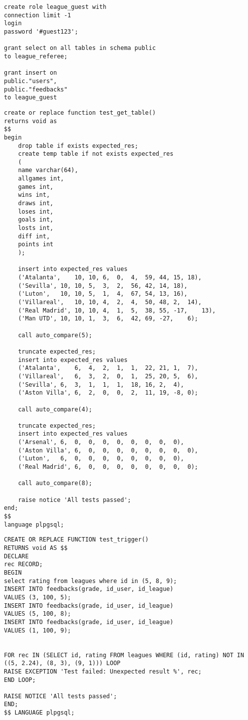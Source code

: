 \begin{lstlisting}[caption={Создание роли гости и выдыча права}, label={lst:role5}]
create role league_guest with
connection limit -1
login
password '#guest123';

grant select on all tables in schema public
to league_referee;	

grant insert on
public."users",
public."feedbacks"
to league_guest
\end{lstlisting}

\begin{lstlisting}[caption={Реализация тестирования для функции get\_table\_league}, label={lst:test1}]
create or replace function test_get_table()
returns void as
$$
begin
	drop table if exists expected_res;
	create temp table if not exists expected_res
	(
	name varchar(64),
	allgames int,
	games int,
	wins int,
	draws int,
	loses int,
	goals int,
	losts int,
	diff int,
	points int
	);
	
	insert into expected_res values
	('Atalanta',	10,	10,	6,	0,	4,	59,	44,	15,	18),
	('Sevilla',	10,	10,	5,	3,	2,	56,	42,	14,	18),
	('Luton',	10,	10,	5,	1,	4,	67,	54,	13,	16),
	('Villareal',	10,	10,	4,	2,	4,	50,	48,	2,	14),
	('Real Madrid',	10,	10,	4,	1,	5,	38,	55,	-17,	13),
	('Man UTD',	10,	10,	1,	3,	6,	42,	69,	-27,	6);
	
	call auto_compare(5);
	
	truncate expected_res;
	insert into expected_res values
	('Atalanta',	6,	4,	2,	1,	1,	22,	21,	1,	7),
	('Villareal',	6,	3,	2,	0,	1,	25,	20,	5,	6),
	('Sevilla',	6,	3,	1,	1,	1,	18,	16,	2,	4),
	('Aston Villa',	6,	2,	0,	0,	2,	11,	19,	-8,	0);
	
	call auto_compare(4);
	
	truncate expected_res;
	insert into expected_res values
	('Arsenal',	6,	0,	0,	0,	0,	0,	0,	0,	0),
	('Aston Villa',	6,	0,	0,	0,	0,	0,	0,	0,	0),
	('Luton',	6,	0,	0,	0,	0,	0,	0,	0,	0),
	('Real Madrid',	6,	0,	0,	0,	0,	0,	0,	0,	0);
	
	call auto_compare(8);
	
	raise notice 'All tests passed';
end;
$$
language plpgsql;
\end{lstlisting}

\begin{lstlisting}[caption={Реализация тестирования для триггера auto\_cal\_rating}, label={lst:test2}]
CREATE OR REPLACE FUNCTION test_trigger()
RETURNS void AS $$
DECLARE
rec RECORD;
BEGIN
select rating from leagues where id in (5, 8, 9);
INSERT INTO feedbacks(grade, id_user, id_league) 
VALUES (3, 100, 5);
INSERT INTO feedbacks(grade, id_user, id_league) 
VALUES (5, 100, 8);
INSERT INTO feedbacks(grade, id_user, id_league) 
VALUES (1, 100, 9);


FOR rec IN (SELECT id, rating FROM leagues WHERE (id, rating) NOT IN ((5, 2.24), (8, 3), (9, 1))) LOOP
RAISE EXCEPTION 'Test failed: Unexpected result %', rec;
END LOOP;

RAISE NOTICE 'All tests passed';
END;
$$ LANGUAGE plpgsql;
\end{lstlisting}